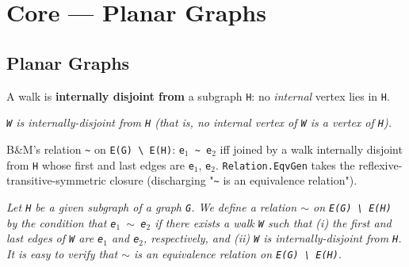 \section{Core --- Planar Graphs}
\subsection{Planar Graphs}


\begin{definition}
\label{SimpleGraph.Walk.InternallyDisjointFrom}
\leanok
A walk is \textbf{internally disjoint from} a subgraph \texttt{H}: no \emph{internal}
vertex lies in \texttt{H}.

\emph{\texttt{W} is internally-disjoint from \texttt{H}
(that is, no internal vertex of \texttt{W} is a vertex of \texttt{H}).}
\end{definition}

\begin{definition}
\label{SimpleGraph.bridgeRel}
\leanok
{}
B\&M's relation \texttt{\textasciitilde{}} on \texttt{E(G) \textbackslash{} E(H)}:
\texttt{e$_{1}$ \textasciitilde{} e$_{2}$} iff joined by a walk internally disjoint from
\texttt{H} whose first and last edges are \texttt{e$_{1}$}, \texttt{e$_{2}$}.
\texttt{Relation.EqvGen} takes the reflexive-transitive-symmetric closure (discharging
"\texttt{\textasciitilde{}} is an equivalence relation").

\emph{Let \texttt{H} be a given subgraph of a graph
\texttt{G}.  We define a relation \texttt{$\sim$} on \texttt{E(G) \textbackslash{} E(H)} by the condition that \texttt{e$_{1}$ $\sim$ e$_{2}$} if
there exists a walk \texttt{W} such that (i) the first and last edges of \texttt{W} are
\texttt{e$_{1}$} and
\texttt{e$_{2}$}, respectively, and (ii) \texttt{W} is internally-disjoint from \texttt{H}.  It is easy to
verify that \texttt{$\sim$} is an equivalence relation on \texttt{E(G) \textbackslash{}
E(H)}.}
\end{definition}

